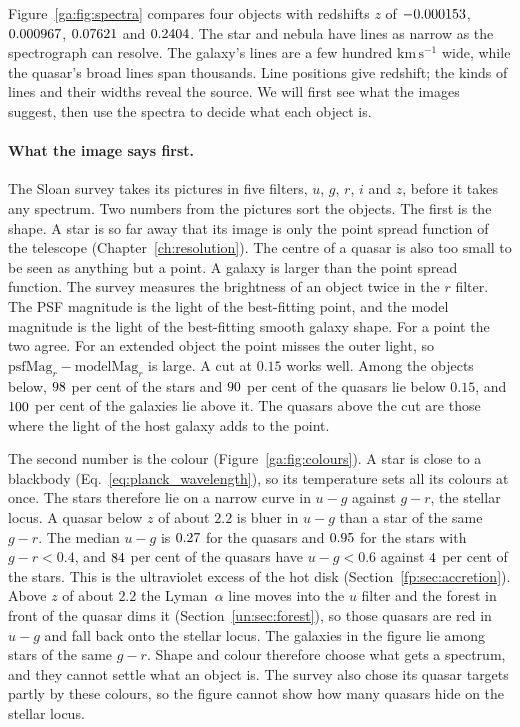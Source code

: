 Figure~\ref{ga:fig:spectra} compares four objects with redshifts $z$ of $-0.000153$, $0.000967$, $0.07621$ and $0.2404$. The star and nebula have lines as narrow as the spectrograph can resolve. The galaxy's lines are a few hundred $\mathrm{km\,s^{-1}}$ wide, while the quasar's broad lines span thousands. Line positions give redshift; the kinds of lines and their widths reveal the source. We will first see what the images suggest, then use the spectra to decide what each object is.

\paragraph{What the image says first.} The Sloan survey takes its pictures in five filters, $u$, $g$, $r$, $i$ and $z$, before it takes any spectrum. Two numbers from the pictures sort the objects. The first is the shape. A star is so far away that its image is only the point spread function of the telescope (Chapter~\ref{ch:resolution}). The centre of a quasar is also too small to be seen as anything but a point. A galaxy is larger than the point spread function. The survey measures the brightness of an object twice in the $r$ filter. The PSF magnitude is the light of the best-fitting point, and the model magnitude is the light of the best-fitting smooth galaxy shape. For a point the two agree. For an extended object the point misses the outer light, so $\mathrm{psfMag}_r-\mathrm{modelMag}_r$ is large. A cut at $0.15$ works well. Among the objects below, $98$ per cent of the stars and $90$ per cent of the quasars lie below $0.15$, and $100$ per cent of the galaxies lie above it. The quasars above the cut are those where the light of the host galaxy adds to the point.

The second number is the colour (Figure~\ref{ga:fig:colours}). A star is close to a blackbody (Eq.~\eqref{eq:planck_wavelength}), so its temperature sets all its colours at once. The stars therefore lie on a narrow curve in $u-g$ against $g-r$, the stellar locus. A quasar below $z$ of about $2.2$ is bluer in $u-g$ than a star of the same $g-r$. The median $u-g$ is $0.27$ for the quasars and $0.95$ for the stars with $g-r<0.4$, and $84$ per cent of the quasars have $u-g<0.6$ against $4$ per cent of the stars. This is the ultraviolet excess of the hot disk (Section~\ref{fp:sec:accretion}). Above $z$ of about $2.2$ the Lyman~$\alpha$ line moves into the $u$ filter and the forest in front of the quasar dims it (Section~\ref{un:sec:forest}), so those quasars are red in $u-g$ and fall back onto the stellar locus. The galaxies in the figure lie among stars of the same $g-r$. Shape and colour therefore choose what gets a spectrum, and they cannot settle what an object is. The survey also chose its quasar targets partly by these colours, so the figure cannot show how many quasars hide on the stellar locus.

